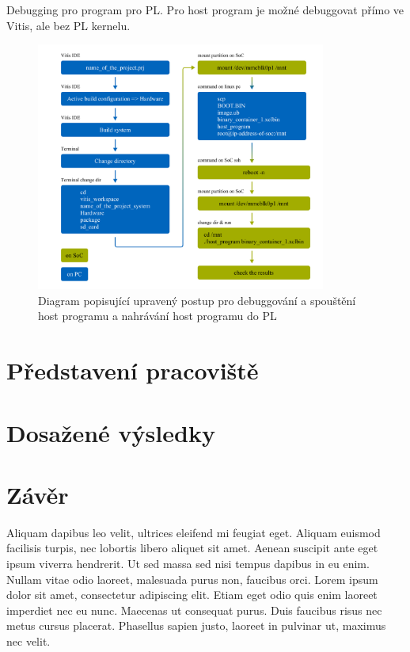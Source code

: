 \documentclass[a4paper, twoside, 11pt]{article}
\begin{document}
	Debugging pro program pro PL. Pro host program je možné debuggovat přímo ve Vitis, ale bez PL kernelu.
	\begin{figure}[htbp!]
		\centering
		\includegraphics[width=0.85\textwidth]{src/png/vitis-edited-debugging-flow.png}
		\caption{Diagram popisující upravený postup pro debuggování a spouštění host programu a nahrávání host programu do PL}
		\label{fig:vitis-edited-debugging-flow}
	\end{figure}

\section{Představení pracoviště}
\section{Dosažené výsledky}


		
\newpage
{} 
\section*{Závěr}
Aliquam dapibus leo velit, ultrices eleifend mi feugiat eget. Aliquam euismod facilisis turpis, nec lobortis libero aliquet sit amet. Aenean suscipit ante eget ipsum viverra hendrerit. Ut sed massa sed nisi tempus dapibus in eu enim. Nullam vitae odio laoreet, malesuada purus non, faucibus orci. Lorem ipsum dolor sit amet, consectetur adipiscing elit. Etiam eget odio quis enim laoreet imperdiet nec eu nunc. Maecenas ut consequat purus. Duis faucibus risus nec metus cursus placerat. Phasellus sapien justo, laoreet in pulvinar ut, maximus nec velit.\par
	
\end{document}
